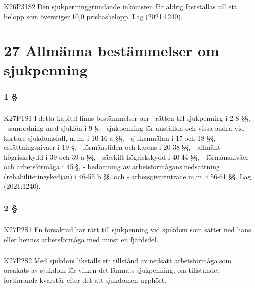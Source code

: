 \documentclass[a4paper,notitlepage,openany,10pt]{book}
\begin{document}
\paragraph*{}
{\tiny K26P31S2}
Den sjukpenninggrundande inkomsten får aldrig fastställas till ett belopp som överstiger 10,0 prisbasbelopp.
Lag (2021:1240).
\chapter*{27 Allmänna bestämmelser om sjukpenning}
\subsection*{1 §}
\paragraph*{}
{\tiny K27P1S1}
I detta kapitel finns bestämmelser om
\newline - rätten till sjukpenning i 2-8 §§,
\newline - samordning med sjuklön i 9 §,
\newline - sjukpenning för anställda och vissa andra vid kortare sjukdomsfall, m.m. i 10-16 a §§,
\newline - sjukanmälan i 17 och 18 §§,
\newline - ersättningsnivåer i 19 §,
\newline - förmånstiden och karens i 20-38 §§,
\newline - allmänt högriskskydd i 39 och 39 a §§,
\newline - särskilt högriskskydd i 40-44 §§,
\newline - förmånsnivåer och arbetsförmåga i 45 §,
\newline - bedömning av arbetsförmågans nedsättning (rehabiliteringskedjan) i 46-55 b §§, och
\newline - arbetsgivarinträde m.m. i 56-61 §§.
Lag (2021:1240).
\subsection*{2 §}
\paragraph*{}
{\tiny K27P2S1}
En försäkrad har rätt till sjukpenning vid sjukdom som sätter ned hans eller hennes arbetsförmåga med minst en fjärdedel.
\paragraph*{}
{\tiny K27P2S2}
Med sjukdom likställs ett tillstånd av nedsatt arbetsförmåga som orsakats av sjukdom för vilken det lämnats sjukpenning, om tillståndet fortfarande kvarstår efter det att sjukdomen upphört.
\end{document}
